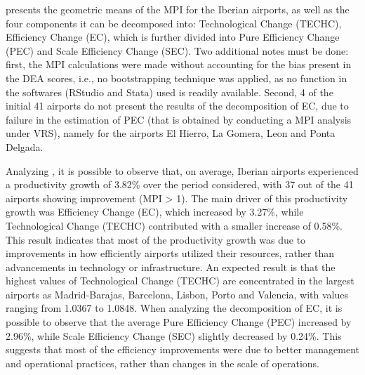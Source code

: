  presents the geometric means of the MPI for the Iberian airports, as well as the four components it can be decomposed into: Technological Change (TECHC), Efficiency Change (EC), which is further divided into Pure Efficiency Change (PEC) and Scale Efficiency Change (SEC). Two additional notes must be done: first, the MPI calculations were made without accounting for the bias present in
the DEA scores, i.e., no bootstrapping technique was applied, as no function in the softwares (RStudio
and Stata) used is readily available. Second, 4 of the initial 41 airports do not present the results of
the decomposition of EC, due to failure in the estimation of PEC (that is obtained by conducting a MPI
analysis under VRS), namely for the airports El Hierro, La Gomera, Leon and Ponta Delgada.


Analyzing , it is possible to observe that, on average, Iberian airports experienced a productivity growth of 3.82\% over the period considered, with 37 out of the 41 airports showing improvement (MPI > 1). The main driver of this productivity growth was Efficiency Change (EC), which increased by 3.27\%, while Technological Change (TECHC) contributed with a smaller increase of 0.58\%. This result indicates that most of the productivity growth was due to improvements in how efficiently airports utilized their resources, rather than advancements in technology or infrastructure. An expected result is that the highest values of Technological Change (TECHC) are concentrated in
the largest airports as Madrid-Barajas, Barcelona, Lisbon, Porto and Valencia, with values ranging from
1.0367 to 1.0848. When analyzing the decomposition of EC, it is possible to observe that the average Pure Efficiency
Change (PEC) increased by 2.96\%, while Scale Efficiency Change (SEC) slightly decreased by 0.24\%.
This suggests that most of the efficiency improvements were due to better management and operational
practices, rather than changes in the scale of operations.
\clearpage
